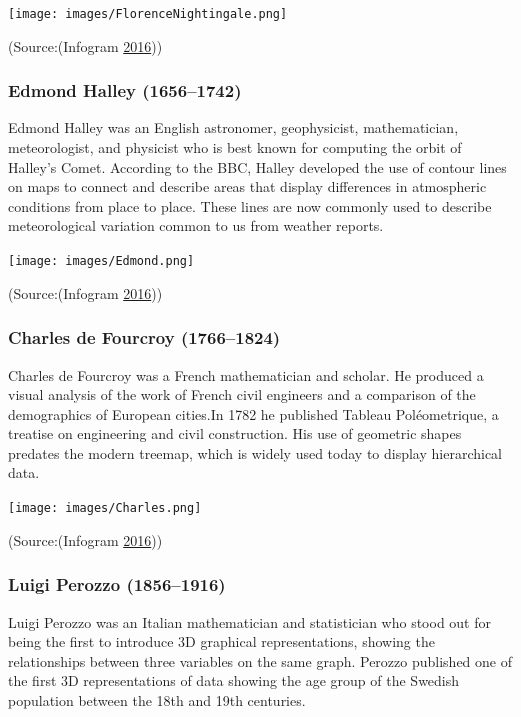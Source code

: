 \documentclass[]{book}
\begin{document}
\texttt{[image: images/FlorenceNightingale.png]}

(Source:(Infogram \protect\hyperlink{ref-history_viz}{2016}))

\hypertarget{edmond-halley-16561742}{%
\subsubsection{Edmond Halley (1656--1742)}\label{edmond-halley-16561742}}

Edmond Halley was an English astronomer, geophysicist, mathematician, meteorologist, and physicist who is best known for computing the orbit of Halley's Comet. According to the BBC, Halley developed the use of contour lines on maps to connect and describe areas that display differences in atmospheric conditions from place to place. These lines are now commonly used to describe meteorological variation common to us from weather reports.

\texttt{[image: images/Edmond.png]}

(Source:(Infogram \protect\hyperlink{ref-history_viz}{2016}))

\hypertarget{charles-de-fourcroy-17661824}{%
\subsubsection{Charles de Fourcroy (1766--1824)}\label{charles-de-fourcroy-17661824}}

Charles de Fourcroy was a French mathematician and scholar. He produced a visual analysis of the work of French civil engineers and a comparison of the demographics of European cities.In 1782 he published Tableau Poléometrique, a treatise on engineering and civil construction. His use of geometric shapes predates the modern treemap, which is widely used today to display hierarchical data.

\texttt{[image: images/Charles.png]}

(Source:(Infogram \protect\hyperlink{ref-history_viz}{2016}))

\hypertarget{luigi-perozzo-18561916}{%
\subsubsection{Luigi Perozzo (1856--1916)}\label{luigi-perozzo-18561916}}

Luigi Perozzo was an Italian mathematician and statistician who stood out for being the first to introduce 3D graphical representations, showing the relationships between three variables on the same graph. Perozzo published one of the first 3D representations of data showing the age group of the Swedish population between the 18th and 19th centuries.
\end{document}
